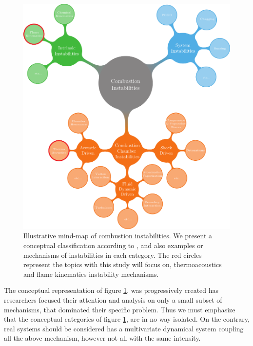 \begin{figure}[!htb]
	\begin{center}
	\includegraphics[scale=1.08]{./img/mindmap}
	\end{center}
	\caption{Illustrative mind-map of combustion instabilities. We present a conceptual classification according to \cite{barrere}, and also examples or mechanisms of instabilities in each category. The red circles represent the topics with this study will focus on, thermoacoustics and flame kinematics instability mechanisms. }
	\label{mindmap}
\end{figure}


The conceptual representation of figure \ref{mindmap}, was progressively created has researchers focused their attention and analysis on only a small subset of mechanisms, that dominated their specific problem.
Thus we must emphasize that the conceptual categories of figure \ref{mindmap}, are in no way isolated.  On the contrary, real systems should be considered has a multivariate dynamical system coupling all the above mechanism, however not all with the same intensity.

